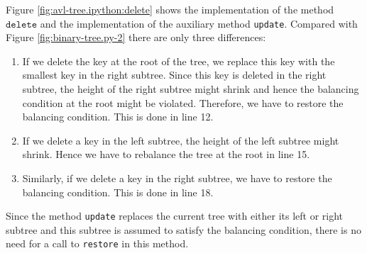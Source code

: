 Figure \ref{fig:avl-tree.ipython:delete} shows the implementation of the method $\texttt{delete}$ and the
implementation of the auxiliary method \texttt{update}.  Compared with Figure
\ref{fig:binary-tree.py-2} there are only three differences:
\begin{enumerate}
\item If we delete the key at the root of the tree, we replace this key with the smallest key in the
      right subtree. Since this key is deleted in the right subtree, the height of the right
      subtree might shrink and hence the balancing condition at the root might be violated.
      Therefore, we have to restore the balancing condition.  This is done in line 12.
\item If we delete a key in the left subtree, the height of the left subtree might shrink.
      Hence we have to rebalance the tree at the root in line 15.
\item Similarly, if we delete a key in the right subtree, we have to restore the balancing
      condition.  This is done in line 18.
\end{enumerate}
Since the method \texttt{update} replaces the current tree with either its left or right subtree and this
subtree is assumed to satisfy the balancing condition, there is no need for a call to \texttt{restore} in this
method. 

